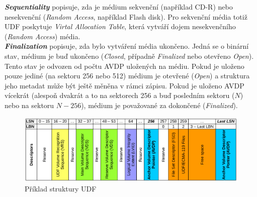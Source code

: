 \textbf{\textit{Sequentiality}} popisuje, zda je médium sekvenční (například CD-R) nebo nesekvenční (\textit{Random Access}, například Flash disk). Pro sekvenční média totiž UDF poskytuje \textit{Virtal Allocation Table}, která vytváří dojem nesekvenčního (\textit{Random Access}) média.\\
\textbf{\textit{Finalization}} popisuje, zda bylo vytváření média ukončeno. Jedná se o binární stav, médium je buď ukončeno (\textit{Closed}, případně \textit{Finalized} nebo otevřeno \textit{Open}). Tento stav je odvozen od počtu AVDP uložených na médiu. Pokud je uloženo pouze jediné (na sektoru 256 nebo 512) médium je otevřené (\textit{Open}) a struktura jeho metadat může být ještě měněna v rámci zápisu. Pokud je uloženo AVDP vícekrát (alespoň dvakrát a to na sektorech 256 a buď posledním sektoru ($N$) nebo na sektoru $N-256$), médium je považované za dokončené (\textit{Finalized}).\\ 
\begin{figure}[] 
    \centering
    \includegraphics[scale=0.45]{obrazky/UDF-example-schema.png}
    \caption{Příklad struktury UDF}
    \label{fig:udf-example}
\end{figure}

